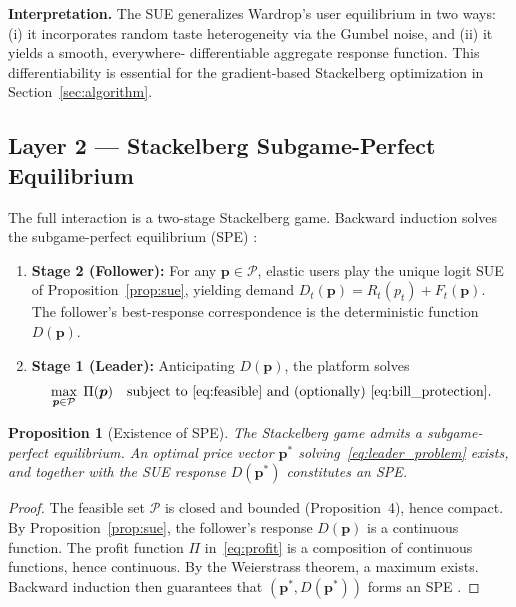 \documentclass[11pt]{article}
\newtheorem{proposition}{Proposition}
\newcommand{\R}{R}
\newcommand{\F}{F}
\newcommand{\D}{D}
\begin{document}
\textbf{Interpretation.} The SUE generalizes Wardrop's user equilibrium
\cite{wardrop1952some} in two ways: (i) it incorporates random taste
heterogeneity via the Gumbel noise, and (ii) it yields a smooth, everywhere-
differentiable aggregate response function. This differentiability is
essential for the gradient-based Stackelberg optimization in
Section~\ref{sec:algorithm}.

\subsection{Layer 2 --- Stackelberg Subgame-Perfect Equilibrium}

The full interaction is a two-stage Stackelberg game. Backward induction
solves the subgame-perfect equilibrium (SPE) \cite{selten1965spieltheoretische}:

\begin{enumerate}[leftmargin=2em]
  \item \textbf{Stage 2 (Follower):} For any $\boldsymbol{p}\in\mathcal{P}$,
  elastic users play the unique logit SUE of Proposition~\ref{prop:sue},
  yielding demand $\D_t(\boldsymbol{p}) = \R_t(p_t) + \F_t(\boldsymbol{p})$.
  The follower's best-response correspondence is the deterministic function
  $\D(\boldsymbol{p})$.
  \item \textbf{Stage 1 (Leader):} Anticipating $\D(\boldsymbol{p})$, the
  platform solves
  \begin{equation}
    \max_{\boldsymbol{p}\in\mathcal{P}} \; \Pi(\boldsymbol{p})
    \quad\text{subject to~\eqref{eq:feasible} and (optionally)~\eqref{eq:bill_protection}}.
    \label{eq:leader_problem}
  \end{equation}
\end{enumerate}

\begin{proposition}[Existence of SPE]
  \label{prop:spe}
  The Stackelberg game admits a subgame-perfect equilibrium. An optimal
  price vector $\boldsymbol{p}^*$ solving~\eqref{eq:leader_problem} exists,
  and together with the SUE response $\D(\boldsymbol{p}^*)$ constitutes an
  SPE.
\end{proposition}

\begin{proof}
  The feasible set $\mathcal{P}$ is closed and bounded (Proposition~4),
  hence compact. By Proposition~\ref{prop:sue}, the follower's response
  $\D(\boldsymbol{p})$ is a continuous function. The profit function
  $\Pi$ in~\eqref{eq:profit} is a composition of continuous functions,
  hence continuous. By the Weierstrass theorem, a maximum exists. Backward
  induction then guarantees that $(\boldsymbol{p}^*, \D(\boldsymbol{p}^*))$
  forms an SPE \cite{fudenberg1991game}.
\end{proof}
\end{document}
